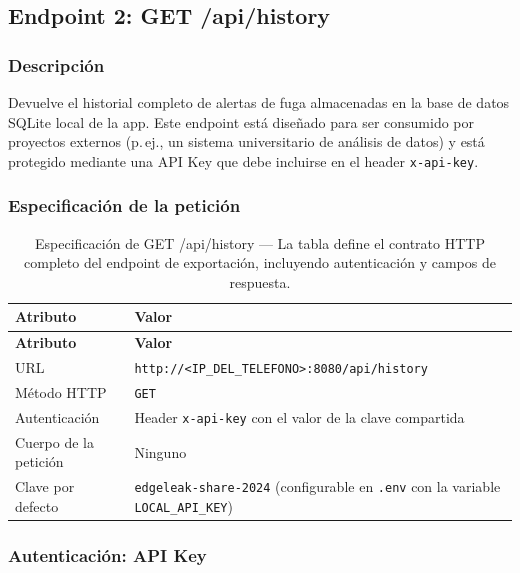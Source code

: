 \documentclass[12pt,a4paper]{article}
\begin{document}
\subsection{Endpoint 2: GET /api/history}

\subsubsection{Descripción}

Devuelve el historial completo de alertas de fuga almacenadas en la base de datos
SQLite local de la app. Este endpoint está diseñado para ser consumido por proyectos
externos (p.\,ej., un sistema universitario de análisis de datos) y está protegido
mediante una API Key que debe incluirse en el header \texttt{x-api-key}.

\subsubsection{Especificación de la petición}

\begin{longtable}{p{3cm} p{10.5cm}}
\caption{Especificación de GET /api/history --- La tabla define el contrato HTTP
  completo del endpoint de exportación, incluyendo autenticación y campos de respuesta.}
\label{tab:spec-get} \\
\toprule
\textbf{Atributo} & \textbf{Valor} \\
\midrule
\endfirsthead
\toprule
\textbf{Atributo} & \textbf{Valor} \\
\midrule
\endhead
\bottomrule
\endlastfoot
URL & \texttt{http://<IP\_DEL\_TELEFONO>:8080/api/history} \\[0.5em]
Método HTTP & \texttt{GET} \\[0.5em]
Autenticación & Header \texttt{x-api-key} con el valor de la clave compartida \\[0.5em]
Cuerpo de la petición & Ninguno \\[0.5em]
Clave por defecto & \texttt{edgeleak-share-2024} (configurable en \texttt{.env} con
  la variable \texttt{LOCAL\_API\_KEY}) \\
\end{longtable}

\subsubsection{Autenticación: API Key}
\end{document}
